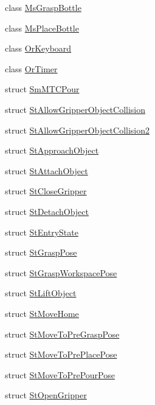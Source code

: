 \begin{DoxyCompactItemize}
\item 
class \hyperlink{classsm__mtc__pour_1_1MsGraspBottle}{Ms\+Grasp\+Bottle}
\item 
class \hyperlink{classsm__mtc__pour_1_1MsPlaceBottle}{Ms\+Place\+Bottle}
\item 
class \hyperlink{classsm__mtc__pour_1_1OrKeyboard}{Or\+Keyboard}
\item 
class \hyperlink{classsm__mtc__pour_1_1OrTimer}{Or\+Timer}
\item 
struct \hyperlink{structsm__mtc__pour_1_1SmMTCPour}{Sm\+M\+T\+C\+Pour}
\item 
struct \hyperlink{structsm__mtc__pour_1_1StAllowGripperObjectCollision}{St\+Allow\+Gripper\+Object\+Collision}
\item 
struct \hyperlink{structsm__mtc__pour_1_1StAllowGripperObjectCollision2}{St\+Allow\+Gripper\+Object\+Collision2}
\item 
struct \hyperlink{structsm__mtc__pour_1_1StApproachObject}{St\+Approach\+Object}
\item 
struct \hyperlink{structsm__mtc__pour_1_1StAttachObject}{St\+Attach\+Object}
\item 
struct \hyperlink{structsm__mtc__pour_1_1StCloseGripper}{St\+Close\+Gripper}
\item 
struct \hyperlink{structsm__mtc__pour_1_1StDetachObject}{St\+Detach\+Object}
\item 
struct \hyperlink{structsm__mtc__pour_1_1StEntryState}{St\+Entry\+State}
\item 
struct \hyperlink{structsm__mtc__pour_1_1StGraspPose}{St\+Grasp\+Pose}
\item 
struct \hyperlink{structsm__mtc__pour_1_1StGraspWorkspacePose}{St\+Grasp\+Workspace\+Pose}
\item 
struct \hyperlink{structsm__mtc__pour_1_1StLiftObject}{St\+Lift\+Object}
\item 
struct \hyperlink{structsm__mtc__pour_1_1StMoveHome}{St\+Move\+Home}
\item 
struct \hyperlink{structsm__mtc__pour_1_1StMoveToPreGraspPose}{St\+Move\+To\+Pre\+Grasp\+Pose}
\item 
struct \hyperlink{structsm__mtc__pour_1_1StMoveToPrePlacePose}{St\+Move\+To\+Pre\+Place\+Pose}
\item 
struct \hyperlink{structsm__mtc__pour_1_1StMoveToPrePourPose}{St\+Move\+To\+Pre\+Pour\+Pose}
\item 
struct \hyperlink{structsm__mtc__pour_1_1StOpenGripper}{St\+Open\+Gripper}

\end{DoxyCompactItemize}
